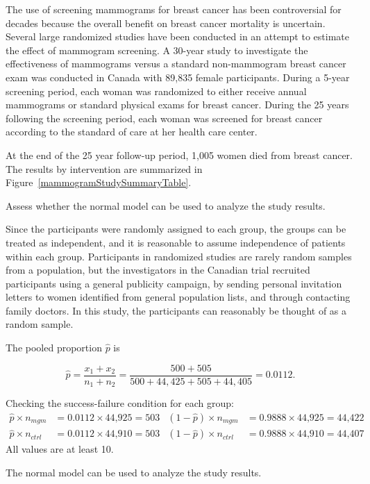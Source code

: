 \begin{examplewrap}
\begin{nexample}{The use of screening mammograms for breast cancer has been controversial for decades because the overall benefit on breast cancer mortality is uncertain.  Several large randomized studies have been conducted in an attempt to estimate the effect of mammogram screening. A 30-year study to investigate the effectiveness of mammograms versus a standard non-mammogram breast cancer exam was conducted in Canada with 89,835 female participants.\footnotemark{} During a 5-year screening period, each woman was randomized to either receive annual mammograms or standard physical exams for breast cancer.  During the 25 years following the screening period, each woman was screened for breast cancer according to the standard of care at her health care center. \vspace{3mm}

At the end of the 25 year follow-up period, 1,005 women died from breast cancer. The results by intervention are summarized in Figure~\ref{mammogramStudySummaryTable}. \vspace{3mm}

Assess whether the normal model can be used to analyze the study results.}\label{mammogramSuccessFailure}%

Since the participants were randomly assigned to each group, the groups can be treated as independent, and it is reasonable to assume independence of patients within each group.  Participants in randomized studies are rarely random samples from a population, but the investigators in the Canadian trial recruited  participants using a general publicity campaign, by sending personal invitation letters to women identified from general population lists, and through contacting family doctors.  In this study, the participants can reasonably be thought of as a random sample.

The pooled proportion $\hat{p}$ is  

\[\hat{p} = \dfrac{x_{1} + x_{2}}{n_{1} + n_{2}} = \dfrac{500 + 505}{500 + 44,425 + 505 + 44,405} = 0.0112. \]

Checking the success-failure condition for each group: 
\begin{align*}
\hat{p} \times n_{mgm} &= 0.0112 \times \text{44,925} = 503
& (1 - \hat{p}) \times n_{mgm} &= 0.9888 \times \text{44,925} = \text{44,422} \\
\hat{p} \times n_{ctrl} &= 0.0112 \times \text{44,910} = 503
& (1 - \hat{p}) \times n_{ctrl} &= 0.9888 \times \text{44,910} = \text{44,407}
\end{align*}
All values are at least 10. 

The normal model can be used to analyze the study results.
\end{nexample}
\end{examplewrap}

